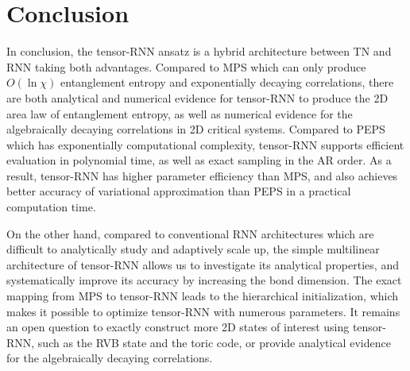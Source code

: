 \section{Conclusion}

In conclusion, the tensor-RNN ansatz is a hybrid architecture between TN and RNN taking both advantages. Compared to MPS which can only produce $O(\ln \chi)$ entanglement entropy and exponentially decaying correlations, there are both analytical and numerical evidence for tensor-RNN to produce the 2D area law of entanglement entropy, as well as numerical evidence for the algebraically decaying correlations in 2D critical systems. Compared to PEPS which has exponentially computational complexity, tensor-RNN supports efficient evaluation in polynomial time, as well as exact sampling in the AR order. As a result, tensor-RNN has higher parameter efficiency than MPS, and also achieves better accuracy of variational approximation than PEPS in a practical computation time.

On the other hand, compared to conventional RNN architectures which are difficult to analytically study and adaptively scale up, the simple multilinear architecture of tensor-RNN allows us to investigate its analytical properties, and systematically improve its accuracy by increasing the bond dimension. The exact mapping from MPS to tensor-RNN leads to the hierarchical initialization, which makes it possible to optimize tensor-RNN with numerous parameters. It remains an open question to exactly construct more 2D states of interest using tensor-RNN, such as the RVB state and the toric code, or provide analytical evidence for the algebraically decaying correlations.
